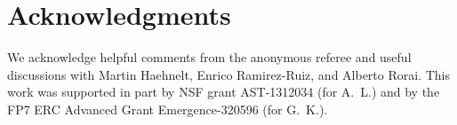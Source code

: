 \documentclass[a4paper,fleqn,usenatbib]{mnras}
\begin{document}
\section*{Acknowledgments}

We acknowledge helpful comments from the anonymous referee and useful
discussions with Martin Haehnelt, Enrico Ramirez-Ruiz, and Alberto
Rorai.  This work was supported in part by NSF grant AST-1312034 (for
A.~L.) and by the FP7 ERC Advanced Grant Emergence-320596 (for G.~K.).


 

\bsp
\label{lastpage}
\end{document}
